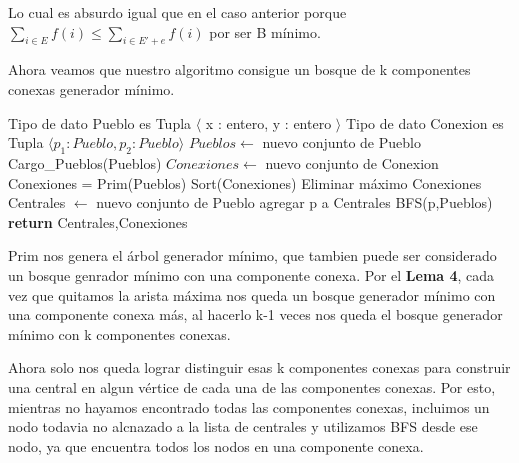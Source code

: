 Lo cual es absurdo igual que en el caso anterior porque $\sum_{i \in E} f(i) \leq \sum_{i \in E'+e} f(i)$ por ser B mínimo.

Ahora veamos que nuestro algoritmo consigue un bosque de k componentes conexas generador mínimo.

\begin{pseudo}
\State Tipo de dato Pueblo es Tupla $\langle$ x : entero, y : entero $\rangle$
\State Tipo de dato Conexion es Tupla $\langle p_1 : Pueblo, p_2 : Pueblo \rangle$
        \State $Pueblos \leftarrow$ nuevo conjunto de Pueblo 
        \State Cargo\_Pueblos(Pueblos) 
        \State $Conexiones \leftarrow$ nuevo conjunto de Conexion 
        \State Conexiones = Prim(Pueblos) 
        \State Sort(Conexiones) 
         
	  \State Eliminar máximo Conexiones 
	\EndFor
        \State Centrales $\leftarrow$ nuevo conjunto de Pueblo 
        \State agregar p a Centrales
        \State BFS(p,Pueblos)
        \EndWhile
        \State \textbf{return} Centrales,Conexiones 
    \EndProcedure
\end{pseudo}

Prim nos genera el árbol generador mínimo, que tambien puede ser considerado un bosque genrador mínimo con una componente conexa. Por el \textbf{Lema 4}, cada vez que quitamos la arista máxima nos queda un bosque generador mínimo con una componente conexa más, al hacerlo k-1 veces nos queda el bosque generador mínimo con k componentes conexas.

Ahora solo nos queda lograr distinguir esas k componentes conexas para construir una central en algun vértice de cada una de las componentes conexas. Por esto, mientras no hayamos encontrado todas las componentes conexas, incluimos un nodo todavia no alcnazado a la lista de centrales y utilizamos BFS desde ese nodo, ya que encuentra todos los nodos en una componente conexa.
